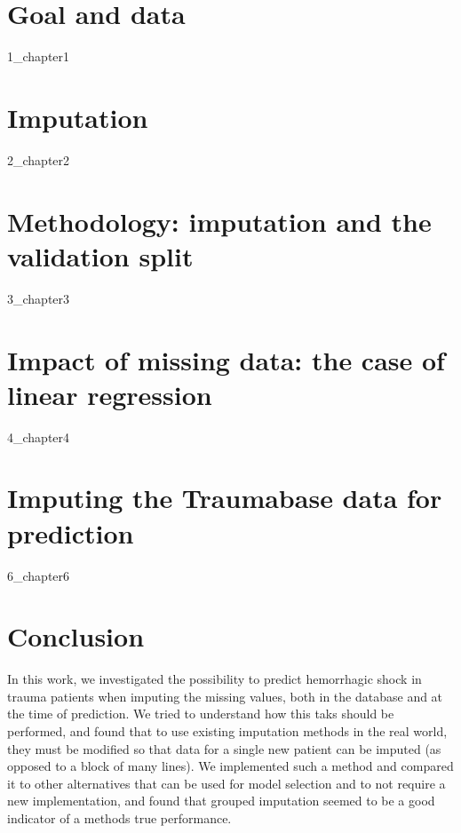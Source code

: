 \documentclass[12pt, a4paper]{memoir}
\begin{document}

\chapter{Goal and data}
\label{data}
 {1_chapter1}

\chapter{Imputation}
\label{imputation}
{2_chapter2}
		
\chapter{Methodology: imputation and the validation split}
\label{validation}
{3_chapter3}
		
		
\chapter{Impact of missing data: the case of linear regression}
\label{linreg}
{4_chapter4} 


\chapter{Imputing the Traumabase data for prediction}
\label{analysis}
{6_chapter6}

\chapter*{Conclusion}
In this work, we investigated the possibility to predict hemorrhagic shock in trauma patients when imputing the missing values, both in the database and at the time of prediction. We tried to understand how this taks should be performed, and found that to use existing imputation methods in the real world, they must be modified so that data for a single new patient can be imputed (as opposed to a block of many lines). We implemented such a method and compared it to other alternatives that can be used for model selection and to not require a new implementation, and found that grouped imputation seemed to be a good indicator of a methods true performance.
\end{document}

